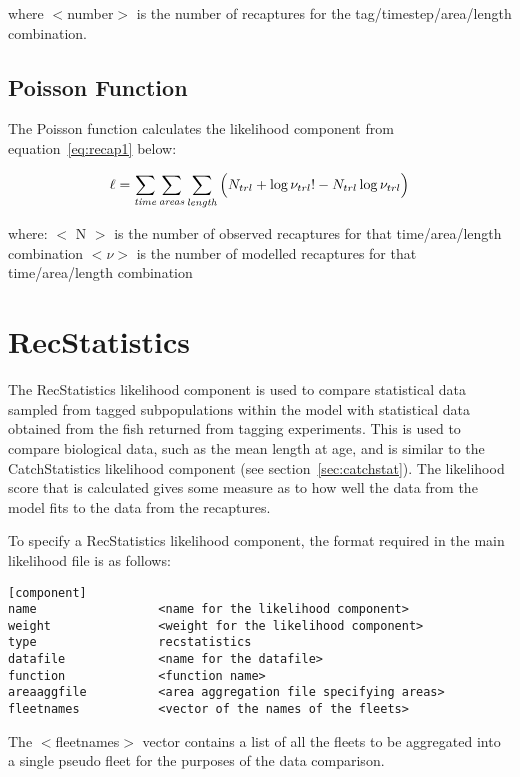 \documentclass[10pt,twoside]{book}
\begin{document}
where $<$number$>$ is the number of recaptures for the tag/timestep/area/length combination.

\subsection{Poisson Function}
The Poisson function calculates the likelihood component from equation~\ref{eq:recap1} below:

\begin{equation}\label{eq:recap1}
\ell = \sum_{\it time}\sum_{\it areas}\sum_{\it length} \Big( N_{trl} + \log \nu_{trl}! - N_{trl} \log \nu_{trl} \Big)
\end{equation}

where:\newline
$<$ N $>$ is the number of observed recaptures for that time/area/length combination\newline
$<\nu>$ is the number of modelled recaptures for that time/area/length combination

\section{RecStatistics}\label{sec:recstat}
The RecStatistics likelihood component is used to compare statistical data sampled from tagged subpopulations within the model with statistical data obtained from the fish returned from tagging experiments.  This is used to compare biological data, such as the mean length at age, and is similar to the CatchStatistics likelihood component (see section~\ref{sec:catchstat}).  The likelihood score that is calculated gives some measure as to how well the data from the model fits to the data from the recaptures.

\bigskip
To specify a RecStatistics likelihood component, the format required in the main likelihood file is as follows:

{\small\begin{verbatim}
[component]
name                 <name for the likelihood component>
weight               <weight for the likelihood component>
type                 recstatistics
datafile             <name for the datafile>
function             <function name>
areaaggfile          <area aggregation file specifying areas>
fleetnames           <vector of the names of the fleets>
\end{verbatim}}

The $<$fleetnames$>$ vector contains a list of all the fleets to be aggregated into a single pseudo fleet for the purposes of the data comparison.
\end{document}
